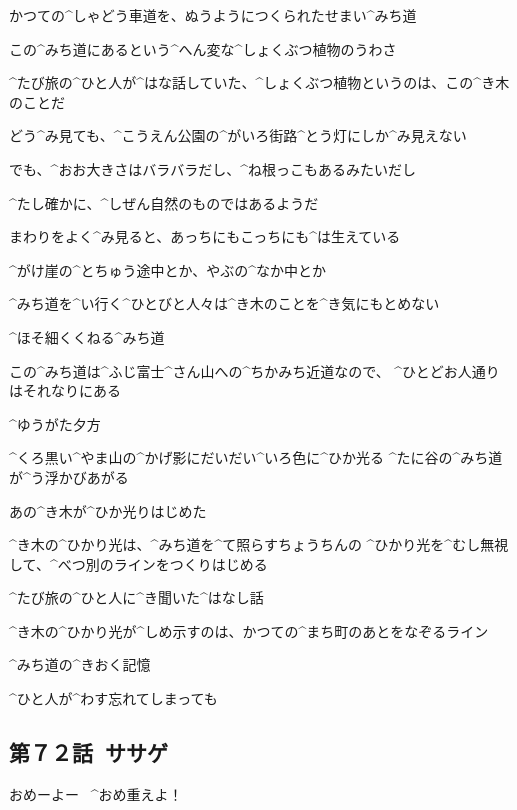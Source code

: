 \page[81]
\Alpha かつての^{しゃどう}{車道}を、ぬうようにつくられたせまい^{みち}{道}

\Alpha この^{みち}{道}にあるという^{へん}{変}な^{しょくぶつ}{植物}のうわさ

\Alpha ^{たび}{旅}の^{ひと}{人}が^{はな}{話}していた、^{しょくぶつ}{植物}というのは、この^{き}{木}のことだ

\page[82]
\Alpha どう^{み}{見}ても、^{こうえん}{公園}の^{がいろ}{街路}^{とう}{灯}にしか^{み}{見}えない

\Alpha でも、^{おお}{大}きさはバラバラだし、^{ね}{根}っこもあるみたいだし

\Alpha ^{たし}{確}かに、^{しぜん}{自然}のものではあるようだ

\page[83]
\Alpha まわりをよく^{み}{見}ると、あっちにもこっちにも^{は}{生}えている

\Alpha ^{がけ}{崖}の^{とちゅう}{途中}とか、やぶの^{なか}{中}とか

\Alpha ^{みち}{道}を^{い}{行}く^{ひとびと}{人々}は^{き}{木}のことを^{き}{気}にもとめない

\Alpha ^{ほそ}{細}くくねる^{みち}{道}

\Alpha この^{みち}{道}は^{ふじ}{富士}^{さん}{山}への^{ちかみち}{近道}なので、
^{ひとどお}{人通}りはそれなりにある

\page[85]
\Alpha ^{ゆうがた}{夕方}

\Alpha ^{くろ}{黒}い^{やま}{山}の^{かげ}{影}にだいだい^{いろ}{色}に^{ひか}{光}る
^{たに}{谷}の^{みち}{道}が^{う}{浮}かびあがる

\page[86]
\Alpha あの^{き}{木}が^{ひか}{光}りはじめた

\page[87]
\Alpha ^{き}{木}の^{ひかり}{光}は、^{みち}{道}を^{て}{照}らすちょうちんの
^{ひかり}{光}を^{むし}{無視}して、^{べつ}{別}のラインをつくりはじめる

\Alpha ^{たび}{旅}の^{ひと}{人}に^{き}{聞}いた^{はなし}{話}

\page[88]
\Alpha ^{き}{木}の^{ひかり}{光}が^{しめ}{示}すのは、かつての^{まち}{町}のあとをなぞるライン

\Alpha ^{みち}{道}の^{きおく}{記憶}

\Alpha ^{ひと}{人}が^{わす}{忘}れてしまっても


\subsection{第７２話\ ササゲ}

\page[95]
\Takahiro おめーよー
\ ^{おめ}{重}えよ！

